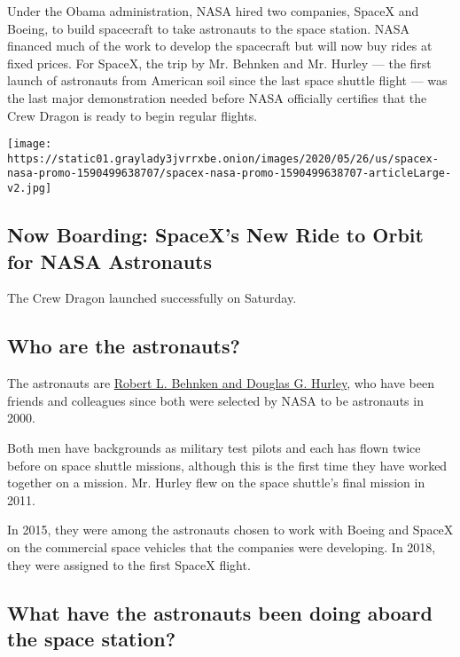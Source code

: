 Under the Obama administration, NASA hired two companies, SpaceX and
Boeing, to build spacecraft to take astronauts to the space station.
NASA financed much of the work to develop the spacecraft but will now
buy rides at fixed prices. For SpaceX, the trip by Mr. Behnken and Mr.
Hurley --- the first launch of astronauts from American soil since the
last space shuttle flight --- was the last major demonstration needed
before NASA officially certifies that the Crew Dragon is ready to begin
regular flights.

\href{https://www.nytimes3xbfgragh.onion/interactive/2020/05/26/science/spacex-nasa.html}{}

\texttt{[image: https://static01.graylady3jvrrxbe.onion/images/2020/05/26/us/spacex-nasa-promo-1590499638707/spacex-nasa-promo-1590499638707-articleLarge-v2.jpg]}

\hypertarget{now-boarding-spacexs-new-ride-to-orbit-for-nasa-astronauts}{%
\subsection{Now Boarding: SpaceX's New Ride to Orbit for NASA
Astronauts}\label{now-boarding-spacexs-new-ride-to-orbit-for-nasa-astronauts}}

The Crew Dragon launched successfully on Saturday.

\hypertarget{who-are-the-astronauts}{%
\subsection{Who are the astronauts?}\label{who-are-the-astronauts}}

The astronauts are
\href{https://www.nytimes3xbfgragh.onion/2020/05/27/science/bob-behnken-doug-hurley.html}{Robert
L. Behnken and Douglas G. Hurley}, who have been friends and colleagues
since both were selected by NASA to be astronauts in 2000.

Both men have backgrounds as military test pilots and each has flown
twice before on space shuttle missions, although this is the first time
they have worked together on a mission. Mr. Hurley flew on the space
shuttle's final mission in 2011.

In 2015, they were among the astronauts chosen to work with Boeing and
SpaceX on the commercial space vehicles that the companies were
developing. In 2018, they were assigned to the first SpaceX flight.

\hypertarget{what-have-the-astronauts-been-doing-aboard-the-space-station}{%
\subsection{What have the astronauts been doing aboard the space
station?}\label{what-have-the-astronauts-been-doing-aboard-the-space-station}}

